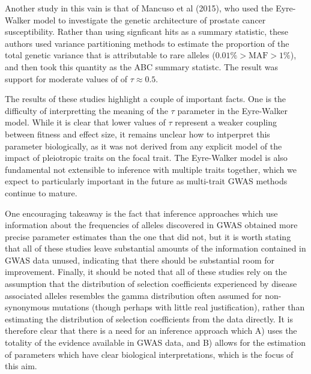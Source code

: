 \documentclass[11pt]{article}
\begin{document}
Another study in this vain is that of Mancuso et al (2015)\cite{Mancuso:2015cp}, who used the Eyre-Walker model to investigate the genetic architecture of prostate cancer susceptibility. Rather than using signficant hits as a summary statistic, these authors used variance partitioning methods\cite{Yang:2011hd} to estimate the proportion of the total genetic variance that is attributable to rare alleles ($0.01\% > \text{MAF} > 1\%$), and then took this quantity as the ABC summary statistc. The result was support for moderate values of of $\tau \approx 0.5$.

The results of these studies highlight a couple of important facts. One is the difficulty of interpretting the meaning of the $\tau$ parameter in the Eyre-Walker model. While it is clear that lower values of $\tau$ represent a weaker coupling between fitness and effect size, it remains unclear how to intperpret this parameter biologically, as it was not derived from any explicit model of the impact of pleiotropic traits on the focal trait. The Eyre-Walker model is also fundamental not extensible to inference with multiple traits together, which we expect to particularly important in the future as multi-trait GWAS methods continue to mature.\cite{PickrellPairwise,SomeMatthewStephensPaper}

One encouraging takeaway is the fact that inference approaches which use information about the frequencies of alleles discovered in GWAS\cite{Mancuso:2015cp, Fuchsberger:2016df} obtained more precise parameter estimates than the one that did not\cite{Agarwala:2013bu}, but it is worth stating that all of these studies leave substantial amounts of the information contained in GWAS data unused, indicating that there should be substantial room for improvement. Finally, it should be noted that all of these studies rely on the assumption that the distribution of selection coefficients experienced by disease associated alleles resembles the gamma distribution often assumed for non-synonymous mutations\cite{EyreWalker:2007dl} (though perhaps with little real justification\cite{Racimo:2014cb}), rather than estimating the distribution of selection coefficients from the data directly. It is therefore clear that there is a need for an inference approach which A) uses the totality of the evidence available in GWAS data, and B) allows for the estimation of parameters which have clear biological interpretations, which is the focus of this aim.
\end{document}
